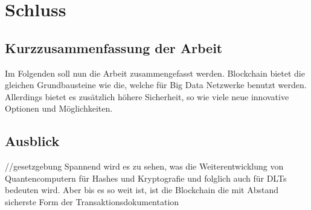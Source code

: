 \chapter{Schluss}


\section{Kurzzusammenfassung der Arbeit}
Im Folgenden soll nun die Arbeit zusammengefasst werden. 
Blockchain bietet die gleichen Grundbausteine wie die, welche für Big Data Netzwerke benutzt werden. Allerdings bietet es zusätzlich höhere Sicherheit, so wie viele neue innovative Optionen und Möglichkeiten.

\section{Ausblick}
//gesetzgebung
Spannend wird es zu sehen, was die Weiterentwicklung von Quantencomputern für Hashes und Kryptografie und folglich auch für DLTs bedeuten wird. Aber bis es so weit ist, ist die Blockchain die mit Abstand sicherste Form der Transaktionsdokumentation